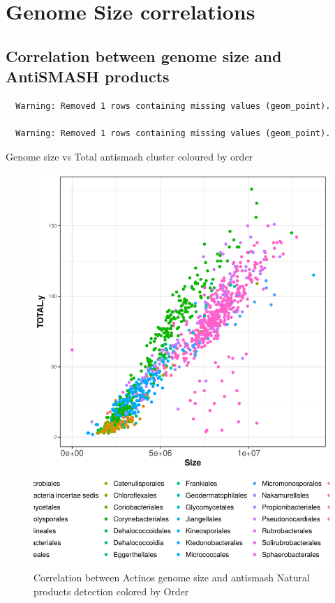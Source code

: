\documentclass[12pt,twoside]{reedthesis}
\begin{document}
  \section{Genome Size correlations}\label{genome-size-correlations-1}
  
  \subsection{Correlation between genome size and AntiSMASH
  products}\label{correlation-between-genome-size-and-antismash-products-1}
  
  \begin{verbatim}
  Warning: Removed 1 rows containing missing values (geom_point).
  
  Warning: Removed 1 rows containing missing values (geom_point).
  \end{verbatim}
  
  Genome size vs Total antismash cluster coloured by order
  
  \begin{figure}[h!tbp]
  \centering
  \includegraphics[angle = 0,scale = 0.6]{chapter4/ActinosSMASHvsSizebyOrder.pdf}
  \caption[Correlation between Actinos genome size and antismash Natural products detection colored by Order]{\normalsize{Correlation between Actinos genome size and antismash Natural products detection colored by Order}}
  \label{fig:ActinosSMASHvsSizebyOrder}
  \end{figure}
  
\end{document}
